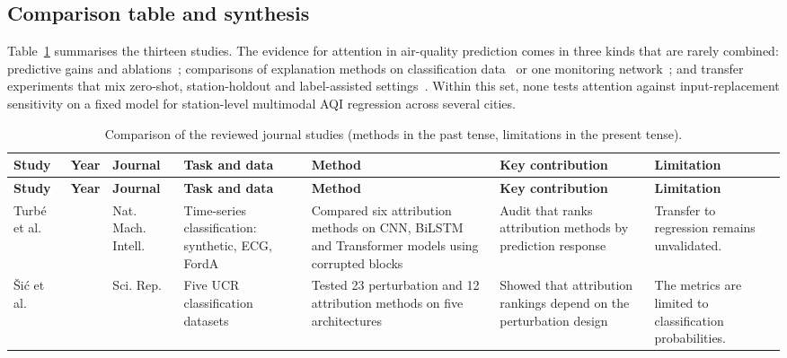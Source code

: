 \documentclass[pdflatex,sn-mathphys-num]{sn-jnl}
\begin{document}
\subsection{Comparison table and synthesis}
Table~\ref{tab:literature} summarises the thirteen studies. The evidence for attention in air-quality prediction comes in three kinds that are rarely combined: predictive gains and ablations~\cite{ma,chen23,liu23}; comparisons of explanation methods on classification data~\cite{turbe,simic} or one monitoring network~\cite{zhang}; and transfer experiments that mix zero-shot, station-holdout and label-assisted settings~\cite{ma,li,liu25,poelzl,liu23}. Within this set, none tests attention against input-replacement sensitivity on a fixed model for station-level multimodal AQI regression across several cities.

\begin{landscape}
\begingroup
\scriptsize
\setlength{\tabcolsep}{3pt}
\begin{longtable}{>{\raggedright\arraybackslash}p{2.4cm}>{\raggedright\arraybackslash}p{0.9cm}>{\raggedright\arraybackslash}p{1.9cm}>{\raggedright\arraybackslash}p{3.0cm}>{\raggedright\arraybackslash}p{3.8cm}>{\raggedright\arraybackslash}p{3.2cm}>{\raggedright\arraybackslash}p{3.1cm}}
\caption{Comparison of the reviewed journal studies (methods in the past tense, limitations in the present tense).}\label{tab:literature}\\
\toprule
\textbf{Study} & \textbf{Year} & \textbf{Journal} & \textbf{Task and data} & \textbf{Method} & \textbf{Key contribution} & \textbf{Limitation} \\
\midrule
\endfirsthead
\toprule
\textbf{Study} & \textbf{Year} & \textbf{Journal} & \textbf{Task and data} & \textbf{Method} & \textbf{Key contribution} & \textbf{Limitation} \\
\midrule
\endhead
\bottomrule
\endfoot
Turb\'e et al.~\cite{turbe} & 2023 & Nat. Mach. Intell. & Time-series classification: synthetic, ECG, FordA & Compared six attribution methods on CNN, BiLSTM and Transformer models using corrupted blocks & Audit that ranks attribution methods by prediction response & Transfer to regression remains unvalidated. \\
\v{S}i\'c et al.~\cite{simic} & 2025 & Sci. Rep. & Five UCR classification datasets & Tested 23 perturbation and 12 attribution methods on five architectures & Showed that attribution rankings depend on the perturbation design & The metrics are limited to classification probabilities. \\

\end{longtable}
\end{landscape}
\end{document}
